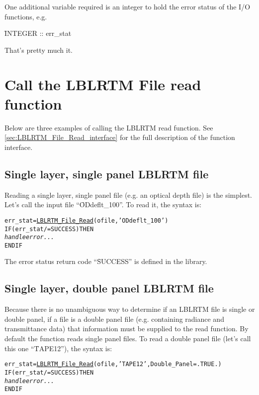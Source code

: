One additional variable required is an integer to hold the error status of the I/O functions, e.g. 

\hspace{0.4cm}\f{INTEGER :: err\_stat}

That's pretty much it.



\section{Call the LBLRTM File read function}

Below are three examples of calling the LBLRTM \File{} read function. See \ref{sec:LBLRTM_File_Read_interface} for the full description of the function interface.

\subsection{Single layer, single panel LBLRTM file}
Reading a single layer, single panel file (e.g. an optical depth file) is the simplest. Let's call the input file ``\f{ODdeflt\_100}''. To read it, the syntax is:
\begin{alltt}
  err_stat = \hyperref[sec:LBLRTM_File_Read_interface]{LBLRTM_File_Read}(ofile, 'ODdeflt_100')
  IF ( err_stat /= SUCCESS ) THEN
    \textrm{\textit{handle error...}}
  END IF\end{alltt}
The error status return code ``\f{SUCCESS}'' is defined in the library.


\subsection{Single layer, double panel LBLRTM file}
Because there is no unambiguous way to determine if an LBLRTM file is single or double panel, if a file is a double panel file (e.g. containing radiance and transmittance data) that information must be supplied to the read function. By default the function reads single panel files. To read a double panel file (let's call this one ``\f{TAPE12}''), the syntax is:
\begin{alltt}
  err_stat = \hyperref[sec:LBLRTM_File_Read_interface]{LBLRTM_File_Read}(ofile, 'TAPE12', Double_Panel=.TRUE.)
  IF ( err_stat /= SUCCESS ) THEN
    \textrm{\textit{handle error...}}
  END IF\end{alltt}

